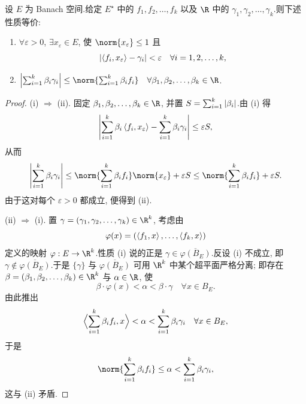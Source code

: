 \begin{lemma}[Helly]
\label{lem:3.3}
设 $E$ 为 Banach 空间.给定 $E^\star$ 中的 $f_1,f_2,\dots,f_k$ 以及 $\R$ 中的
$\gamma_1,\gamma_2,\dots,\gamma_k$.则下述性质等价:
\begin{enumerate}[label=(\roman*), leftmargin=2.4em, itemsep=0.15em]
	\item $\forall\varepsilon>0$, $\exists x_\varepsilon\in E$, 使
	      $\norm{x_\varepsilon}\le1$ 且
	      \begin{equation*}
	      \left|\left\langle f_i,x_\varepsilon\right\rangle-\gamma_i\right|<\varepsilon
	      \quad\forall i=1,2,\dots,k,
	      \end{equation*}
	\item $\abs{\sum_{i=1}^k\beta_i\gamma_i}
	      \le\norm{\sum_{i=1}^k\beta_i f_i}
	      \quad\forall\beta_1,\beta_2,\dots,\beta_k\in\R$.
\end{enumerate}
\end{lemma}

\begin{proof}
(i) $\Rightarrow$ (ii). 固定 $\beta_1,\beta_2,\dots,\beta_k\in\R$, 并置
$S=\sum_{i=1}^k\left|\beta_i\right|$.由 (i) 得
\begin{equation*}
\left|\sum_{i=1}^k\beta_i\left\langle f_i,x_\varepsilon\right\rangle
-\sum_{i=1}^k\beta_i\gamma_i\right|\le\varepsilon S,
\end{equation*}
从而
\begin{equation*}
\abs{\sum_{i=1}^k\beta_i\gamma_i}
\le\norm{\sum_{i=1}^k\beta_i f_i}\norm{x_\varepsilon}+\varepsilon S
\le\norm{\sum_{i=1}^k\beta_i f_i}+\varepsilon S.
\end{equation*}
由于这对每个 $\varepsilon>0$ 都成立, 便得到 (ii).

(ii) $\Rightarrow$ (i). 置 $\gamma=(\gamma_1,\gamma_2,\dots,\gamma_k)\in\R^k$,
考虑由
\begin{equation*}
\varphi(x)=(\left\langle f_1,x\right\rangle,\dots,\left\langle f_k,x\right\rangle)
\end{equation*}
定义的映射 $\varphi:E\to\R^k$.性质 (i) 说的正是
$\gamma\in\overline{\varphi(B_E)}$.反设 (i) 不成立, 即
$\gamma\notin\overline{\varphi(B_E)}$.于是 $\{\gamma\}$ 与
$\overline{\varphi(B_E)}$ 可用 $\R^k$ 中某个超平面严格分离; 即存在
$\beta=(\beta_1,\beta_2,\dots,\beta_k)\in\R^k$ 与 $\alpha\in\R$, 使
\begin{equation*}
\beta\cdot\varphi(x)<\alpha<\beta\cdot\gamma\quad\forall x\in B_E.
\end{equation*}
由此推出
\begin{equation*}
\Bigl\langle\sum_{i=1}^k\beta_i f_i,x\Bigr\rangle<\alpha<\sum_{i=1}^k\beta_i\gamma_i
\quad\forall x\in B_E,
\end{equation*}
于是
\begin{equation*}
\norm{\sum_{i=1}^k\beta_i f_i}\le\alpha<\sum_{i=1}^k\beta_i\gamma_i,
\end{equation*}
这与 (ii) 矛盾.
\end{proof}

